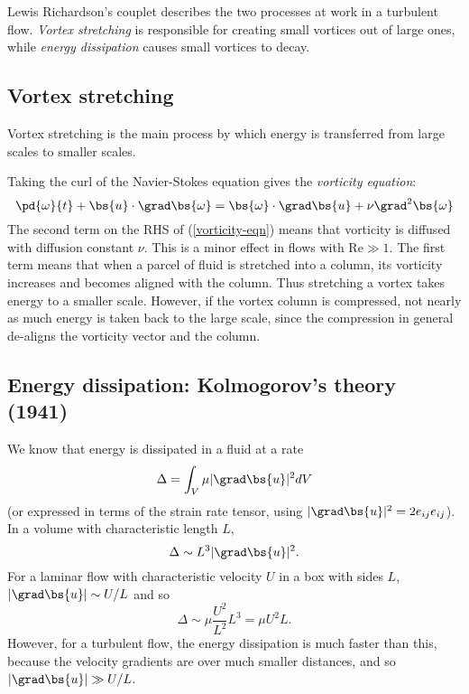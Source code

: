 Lewis Richardson's couplet describes the two processes at work in a turbulent
flow. \textit{Vortex stretching} is responsible for creating small vortices out
of large ones, while \textit{energy dissipation} causes small vortices to decay.

\subsection{Vortex stretching}

Vortex stretching is the main process by which energy is transferred from large
scales to smaller scales.

Taking the curl of the Navier-Stokes equation gives the \textit{vorticity equation}:
\begin{equation}
    \pd{\omega}{t} + \bs{u}\cdot\grad\bs{\omega} 
     = \bs{\omega}\cdot\grad\bs{u} + \nu\grad^2\bs{\omega}
 \label{vorticity-eqn}
\end{equation}
The second term on the RHS of (\ref{vorticity-eqn}) means that vorticity is
diffused with diffusion constant $\nu$. This is a minor effect in flows with
$\mathrm{Re}\gg1$. The first term means that when a parcel of fluid is stretched
into a column, its vorticity increases and becomes aligned with the column. Thus
stretching a vortex takes energy to a smaller scale. However, if the vortex
column is compressed, not nearly as much energy is taken back to the large
scale, since the compression in general de-aligns the vorticity vector and the
column.

\subsection{Energy dissipation: Kolmogorov's theory (1941)}

We know that energy is dissipated in a fluid at a rate
\begin{equation}
	\Delta = \int_V\mu|\grad\bs{u}|^2dV
\end{equation}
(or expressed in terms of the strain rate tensor, using $|\grad\bs{u}|^2=2e_{ij}e_{ij}$). In a volume with characteristic length $L$, 
\begin{equation}
	\Delta \sim L^3 |\grad\bs{u}|^2.
\end{equation}
For a laminar flow with characteristic velocity $U$ in a box with sides $L$, $|\grad\bs{u}|\sim U/L$ and so
\begin{equation}
\Delta \sim \mu\frac{U^2}{L^2}L^3 = \mu U^2 L.
\end{equation}  
However, for a turbulent flow, the energy dissipation is much faster than this, because the velocity gradients are over much smaller distances, and so $|\grad\bs{u}|\gg U/L$. 

